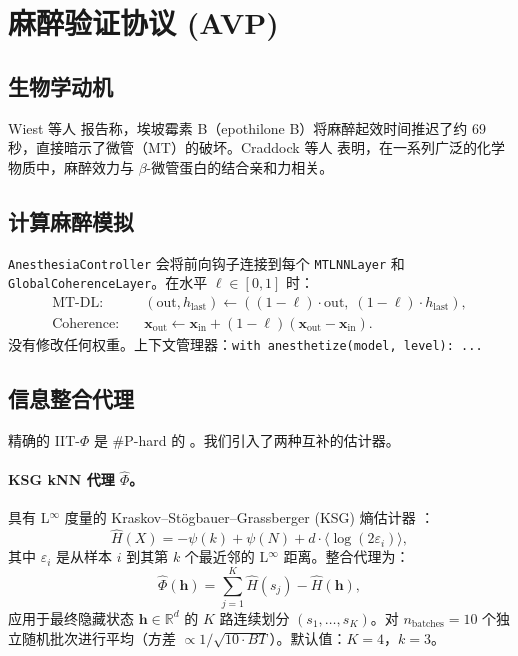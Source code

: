 \documentclass[11pt]{article}
\theoremstyle{definition}
\newcommand{\RR}{\mathbb{R}}
\newcommand{\vh}{\mathbf{h}}
\newcommand{\vx}{\mathbf{x}}
\newcommand{\phihat}{\hat{\Phi}}
\begin{document}
\section{麻醉验证协议 (AVP)}
\label{sec:avp}

\subsection{生物学动机}
Wiest 等人 \citep{wiest2025quantum} 报告称，埃坡霉素 B（epothilone B）将麻醉起效时间推迟了约 69 秒，直接暗示了微管（MT）的破坏。Craddock 等人 \citep{craddock2017anesthetic} 表明，在一系列广泛的化学物质中，麻醉效力与 $\beta$-微管蛋白的结合亲和力相关。

\subsection{计算麻醉模拟}
\texttt{AnesthesiaController} 会将前向钩子连接到每个 \texttt{MTLNNLayer} 和 \texttt{GlobalCoherenceLayer}。在水平 $\ell\in[0,1]$ 时：
\begin{align}
  \text{MT-DL:}& \quad (\text{out}, h_\text{last}) \leftarrow ((1-\ell)\cdot\text{out},\;(1-\ell)\cdot h_\text{last}), \\
  \text{Coherence:}& \quad \vx_\text{out} \leftarrow \vx_\text{in} + (1-\ell)(\vx_\text{out}-\vx_\text{in}).
\end{align}
没有修改任何权重。上下文管理器：\texttt{with anesthetize(model, level): ...}

\subsection{信息整合代理}
\label{sec:proxies}
精确的 IIT-$\Phi$ 是 \#P-hard 的 \citep{aaronson2014why}。我们引入了两种互补的估计器。

\paragraph{KSG kNN 代理 $\phihat$。}
具有 L$^\infty$ 度量的 Kraskov--St\"ogbauer--Grassberger (KSG) 熵估计器 \citep{kraskov2004estimating}：
\begin{equation}
  \hat{H}(X) = -\psi(k) + \psi(N) + d\cdot\langle\log(2\varepsilon_i)\rangle,
\end{equation}
其中 $\varepsilon_i$ 是从样本 $i$ 到其第 $k$ 个最近邻的 L$^\infty$ 距离。整合代理为：
\begin{equation}
  \phihat(\vh) = \sum_{j=1}^{K}\hat{H}(s_j) - \hat{H}(\vh),
  \label{eq:phi_hat}
\end{equation}
应用于最终隐藏状态 $\vh\in\RR^d$ 的 $K$ 路连续划分 $(s_1,\ldots,s_K)$。对 $n_\text{batches}=10$ 个独立随机批次进行平均（方差 $\propto 1/\sqrt{10\cdot BT}$）。默认值：$K=4$，$k=3$。
\end{document}

